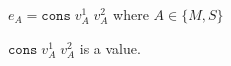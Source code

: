 \begin{case}

$e_{A}=\mathtt{cons}\;v_{A}^{1}\;v_{A}^{2}$ where $A\in\lbrace M,S\rbrace$

$\mathtt{cons}\;v_{A}^{1}\;v_{A}^{2}$ is a value.

\end{case}